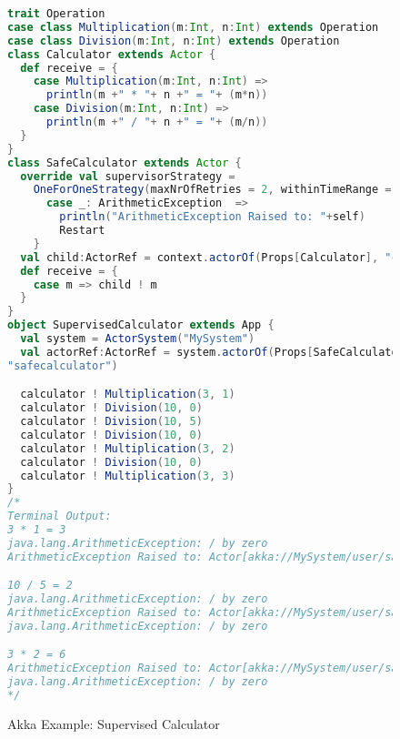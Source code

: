 \begin{figure}[h]

  \begin{lstlisting}[language=scala]
trait Operation
case class Multiplication(m:Int, n:Int) extends Operation
case class Division(m:Int, n:Int) extends Operation
class Calculator extends Actor {
  def receive = {
    case Multiplication(m:Int, n:Int) =>
      println(m +" * "+ n +" = "+ (m*n))
    case Division(m:Int, n:Int) =>
      println(m +" / "+ n +" = "+ (m/n))
  }
}
class SafeCalculator extends Actor {
  override val supervisorStrategy =
    OneForOneStrategy(maxNrOfRetries = 2, withinTimeRange = 1 minute) {
      case _: ArithmeticException  =>
        println("ArithmeticException Raised to: "+self)
        Restart
    }
  val child:ActorRef = context.actorOf(Props[Calculator], "child")
  def receive = {
    case m => child ! m
  }
}
object SupervisedCalculator extends App {
  val system = ActorSystem("MySystem")
  val actorRef:ActorRef = system.actorOf(Props[SafeCalculator],
"safecalculator")

  calculator ! Multiplication(3, 1)
  calculator ! Division(10, 0)
  calculator ! Division(10, 5)
  calculator ! Division(10, 0)
  calculator ! Multiplication(3, 2)
  calculator ! Division(10, 0)
  calculator ! Multiplication(3, 3)
}
/*
Terminal Output:
3 * 1 = 3
java.lang.ArithmeticException: / by zero
ArithmeticException Raised to: Actor[akka://MySystem/user/safecalculator]

10 / 5 = 2
java.lang.ArithmeticException: / by zero
ArithmeticException Raised to: Actor[akka://MySystem/user/safecalculator]
java.lang.ArithmeticException: / by zero

3 * 2 = 6
ArithmeticException Raised to: Actor[akka://MySystem/user/safecalculator]
java.lang.ArithmeticException: / by zero
*/
    \end{lstlisting}
  \caption{Akka Example: Supervised Calculator}
  \label{supervisedcalculator}
\end{figure}